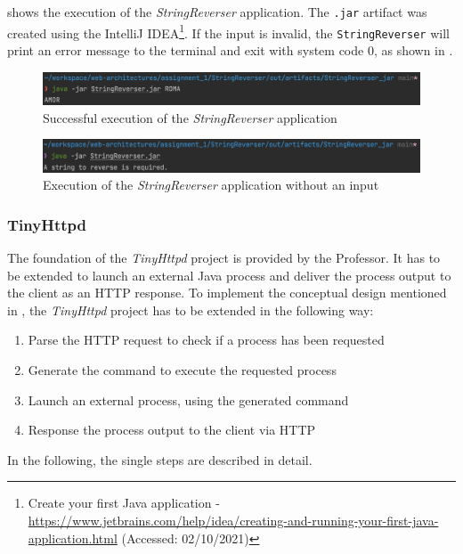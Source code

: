  shows the execution of the \textit{StringReverser} application. The \texttt{.jar} artifact was created using the IntelliJ IDEA\footnote{Create your first Java application - \url{https://www.jetbrains.com/help/idea/creating-and-running-your-first-java-application.html} (Accessed: 02/10/2021)}.
If the input is invalid, the \texttt{StringReverser} will print an error message to the terminal and exit with system code 0, as shown in .

\begin{figure}[h]
\centering
\includegraphics[scale=0.4]{images/StringReverserExec}
\caption{Successful execution of the \textit{StringReverser} application}
\label{fig:01_part1_impl_stringreverser_execution}
\end{figure}

\begin{figure}[h]
\centering
\includegraphics[scale=0.4]{images/StringReverserExecFail}
\caption{Execution of the \textit{StringReverser} application without an input}
\label{fig:01_part1_impl_stringreverser_execution_fail}
\end{figure}

\subsubsection{TinyHttpd}
The foundation of the \textit{TinyHttpd} project is provided by the Professor. It has to be extended to launch an external Java process and deliver the process output to the client as an HTTP response.
To implement the conceptual design mentioned in , the \textit{TinyHttpd} project has to be extended in the following way:
\begin{enumerate}
\item Parse the HTTP request to check if a process has been requested
\item Generate the command to execute the requested process
\item Launch an external process, using the generated command
\item Response the process output to the client via HTTP
\end{enumerate}
In the following, the single steps are described in detail.


